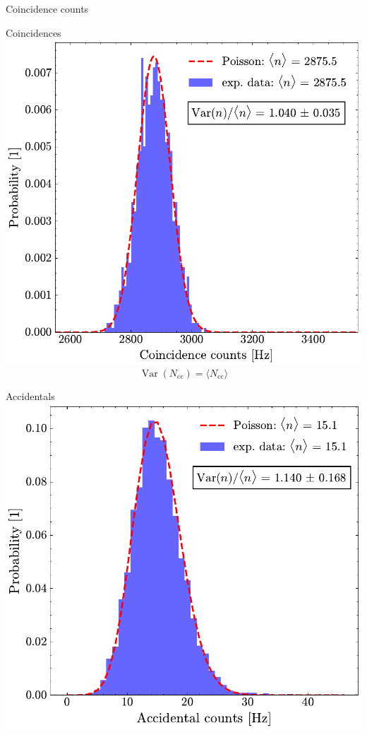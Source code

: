 \documentclass[10pt,aspectratio=43]{beamer}
\begin{document}
	\begin{frame}{Coincidence counts}
		\begin{minipage}{.45\textwidth}
			\centering
			Coincidences
			\vspace{2em}
			\includegraphics[width=\textwidth]{Images/CoincStatistics_2.pdf}
			\vspace*{-2em}
			\begin{equation*}
				\operatorname{Var}\!\left(N_{\text{cc}}\right) = \langle N_{\text{cc}} \rangle
			\end{equation*}
		\end{minipage}
		\hfill
		\begin{minipage}{.45\textwidth}
			\centering
			Accidentals
			\vspace{2em}
			\includegraphics[width=\textwidth]{Images/AccCountsStatistics_2.pdf}

\end{minipage}
\end{frame}
\end{document}

